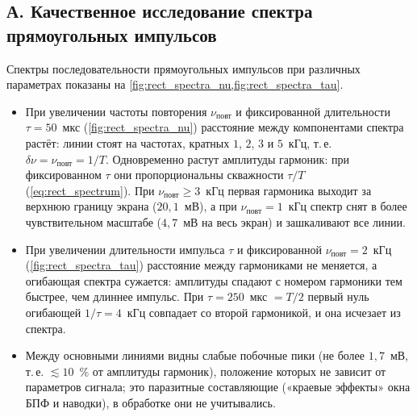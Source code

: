 \documentclass[a4paper,12pt]{article}
\begin{document}
\subsection{А. Качественное исследование спектра прямоугольных импульсов}
Спектры последовательности прямоугольных импульсов при различных параметрах
показаны на \cref{fig:rect_spectra_nu,fig:rect_spectra_tau}.
\begin{itemize}
    \item При увеличении частоты повторения $\nu_{\text{повт}}$ и
          фиксированной длительности $\tau = 50$~мкс
          (\cref{fig:rect_spectra_nu}) расстояние между компонентами спектра
          растёт: линии стоят на частотах, кратных $1$, $2$, $3$ и $5$~кГц,
          т.\,е. $\delta\nu = \nu_{\text{повт}} = 1/T$. Одновременно растут
          амплитуды гармоник: при фиксированном $\tau$ они пропорциональны
          скважности $\tau/T$ (\cref{eq:rect_spectrum}). При
          $\nu_{\text{повт}} \geqslant 3$~кГц первая гармоника выходит за
          верхнюю границу экрана ($20{,}1$~мВ), а при
          $\nu_{\text{повт}} = 1$~кГц спектр снят в более чувствительном
          масштабе ($4{,}7$~мВ на весь экран) и зашкаливают все линии.
    \item При увеличении длительности импульса $\tau$ и фиксированной
          $\nu_{\text{повт}} = 2$~кГц (\cref{fig:rect_spectra_tau})
          расстояние между гармониками не меняется, а огибающая спектра
          сужается: амплитуды спадают с номером гармоники тем быстрее, чем
          длиннее импульс. При $\tau = 250$~мкс $= T/2$ первый нуль
          огибающей $1/\tau = 4$~кГц совпадает со второй гармоникой, и она
          исчезает из спектра.
    \item Между основными линиями видны слабые побочные пики (не более
          $1{,}7$~мВ, т.\,е. $\lesssim 10$~\% от амплитуды гармоник),
          положение которых не зависит от параметров сигнала; это
          паразитные составляющие («краевые эффекты» окна БПФ и наводки),
          в обработке они не учитывались.
\end{itemize}
\end{document}
